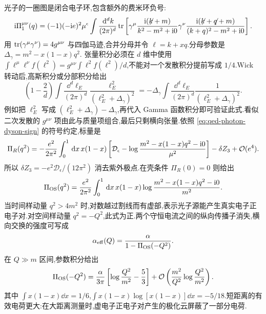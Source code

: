 光子的一圈图是闭合电子环,包含额外的费米环负号:
\begin{equation}
 \mathrm i\Pi^{\mu\nu}_1(q)=(-1)(-\mathrm i e)^2\mu^\epsilon
 \int\frac{\,\mathrm d^dk}{(2\pi)^d}
 \operatorname{tr}\left[\gamma^\mu\frac{\mathrm i(\mathord{\not\mathrel{k}}+m)}{k^2-m^2+\mathrm i0}
 \gamma^\nu\frac{\mathrm i(\mathord{\not\mathrel{k}}+\mathord{\not\mathrel{q}}+m)}{(k+q)^2-m^2+\mathrm i0}\right].
 \label{eq:qed-vacuum-polarization-loop}
\end{equation}
用 $\operatorname{tr}(\gamma^\mu\gamma^\nu)=4g^{\mu\nu}$ 与四伽马迹,合并分母并令 $\ell=k+xq$.分母参数是
$\Delta_\gamma=m^2-x(1-x)q^2$.
张量积分必须在 $d$ 维中使用
$\int\ell^\mu\ell^\nu f(\ell^2)=g^{\mu\nu}\int\ell^2f(\ell^2)/d$,不能对一个发散积分提前写成 $1/4$.Wick 转动后,高斯积分或分部积分给出
\begin{equation}
 \left(1-\frac2d\right)
 \int\frac{\dd^d\ell_E}{(2\pi)^d}
 \frac{\ell_E^2}{(\ell_E^2+\Delta_\gamma)^2}
 =-\Delta_\gamma\int\frac{\dd^d\ell_E}{(2\pi)^d}
       \frac1{(\ell_E^2+\Delta_\gamma)^2}.
 \label{eq:qed-vacpol-transverse-integral}
\end{equation}
例如把 $\ell_E^2$ 写成 $(\ell_E^2+\Delta_\gamma)-\Delta_\gamma$,再代入 Gamma 函数积分即可验证此式.看似二次发散的 $g^{\mu\nu}$ 项由此与质量项组合,最后只剩横向张量.依照 \eqref{eq:qed-photon-dyson-sign} 的符号约定,标量是
\begin{equation}
 \Pi_R(q^2)=-\frac{e^2}{2\pi^2}\int_0^1\,\mathrm d x\,x(1-x)
 \left[\mathcal D_\epsilon-\log\frac{m^2-x(1-x)q^2-\mathrm i0}{\mu^2}\right]
 -\delta Z_3+\mathcal O(e^4).
 \label{eq:qed-pi-unsubtracted}
\end{equation}
所以 $\delta Z_3=-e^2\mathcal D_\epsilon/(12\pi^2)$ 消去紫外极点.在壳条件 $\Pi_R(0)=0$ 则给出
\begin{equation}
 \Pi_{\rm OS}(q^2)=\frac{e^2}{2\pi^2}\int_0^1\,\mathrm d x\,x(1-x)
       \log\frac{m^2-x(1-x)q^2-\mathrm i0}{m^2}.
 \label{eq:qed-pi-os}
\end{equation}
当时间样动量 $q^2>4m^2$ 时,对数越过割线而有虚部,表示光子源能产生真实电子正电子对.对空间样动量 $q^2=-Q^2$,此式为正.两个守恒电流之间的纵向传播子消失,横向交换的强度可写成
\begin{equation}
 \alpha_{\rm eff}(Q)=\frac{\alpha}{1-\Pi_{\rm OS}(-Q^2)}.
 \label{eq:qed-effective-charge-os}
\end{equation}
在 $Q\gg m$ 区间,参数积分给出
\begin{equation}
 \Pi_{\rm OS}(-Q^2)
 =\frac\alpha{3\pi}\left[\log\frac{Q^2}{m^2}-\frac53\right]
       +\mathcal O\left(\frac{m^2}{Q^2}\log\frac{Q^2}{m^2}\right).
 \label{eq:qed-pi-large-q}
\end{equation}
其中 $\int x(1-x)\dd x=1/6$,$\int x(1-x)\log[x(1-x)]\dd x=-5/18$.短距离的有效电荷更大:在大距离测量时,虚电子正电子对产生的极化云屏蔽了一部分电荷.

